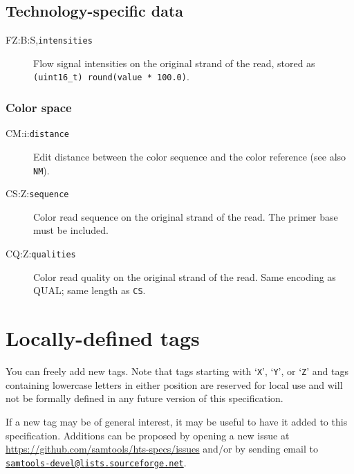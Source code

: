 \documentclass[10pt]{article}
\newcommand{\mailtourl}[1]{\href{mailto:#1}{\tt #1}}
\newcommand{\tagvalue}[1]{\tt #1}
\begin{document}
\subsection{Technology-specific data}

\begin{description}
\item[FZ:B:S,\tagvalue{intensities}]
Flow signal intensities on the original strand of the read, stored as {\tt (uint16\_t) round(value * 100.0)}.
\end{description}

\subsubsection{Color space}


\begin{description}
\item[CM:i:\tagvalue{distance}]
Edit distance between the color sequence and the color reference (see also {\tt NM}).

\item[CS:Z:\tagvalue{sequence}]
Color read sequence on the original strand of the read. The primer base must be included.

\item[CQ:Z:\tagvalue{qualities}]
Color read quality on the original strand of the read. Same encoding as {\sf QUAL}; same length as {\tt CS}.
\end{description}

\section{Locally-defined tags}

You can freely add new tags.
Note that tags starting with `{\tt X}', `{\tt Y}', or `{\tt Z}' and tags
containing lowercase letters in either position are reserved for local use
and will not be formally defined in any future version of this specification.

If a new tag may be of general interest, it may be useful to have it added
to this specification.  Additions can be proposed by opening a new issue at
\url{https://github.com/samtools/hts-specs/issues} and/or by sending email
to \mailtourl{samtools-devel@lists.sourceforge.net}.
\end{document}
